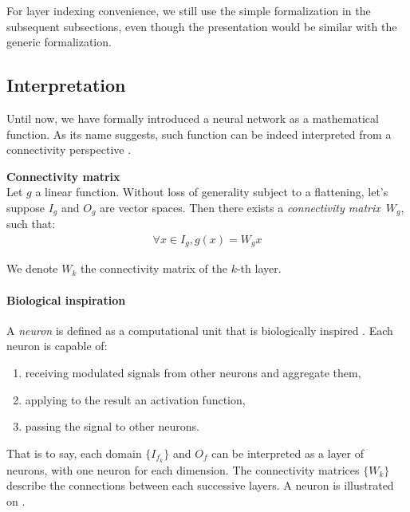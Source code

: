 \begin{remark}
For layer indexing convenience, we still use the simple formalization in the subsequent subsections, even though the presentation would be similar with the generic formalization.
\end{remark}

\subsection{Interpretation}
\label{sec:int}

Until now, we have formally introduced a neural network as a mathematical function. As its name suggests, such function can be indeed interpreted from a connectivity perspective \citep{lecun-87}.

\begin{definition}\textbf{Connectivity matrix}\\
Let $g$ a linear function. Without loss of generality subject to a flattening, let's suppose $I_g$ and $O_g$ are vector spaces. Then there exists a \emph{connectivity matrix}~$W_g$, such that:
\begin{gather*}
\forall x \in I_g, g(x) = W_g x
\end{gather*}
\end{definition}
We denote $W_k$ the connectivity matrix of the $k$-th layer.

\paragraph{Biological inspiration}
A \emph{neuron} is defined as a computational unit that is biologically inspired \citep{mcculloch1943logical}. Each neuron is capable of:
\begin{enumerate}
\item receiving modulated signals from other neurons and aggregate them,
\item applying to the result an activation function,
\item passing the signal to other neurons.\\
\end{enumerate}
That is to say, each domain $\{I_{f_k}\}$ and $O_f$ can be interpreted as a layer of neurons, with one neuron for each dimension. The connectivity matrices $\{W_k\}$ describe the connections between each successive layers.
A neuron is illustrated on .


